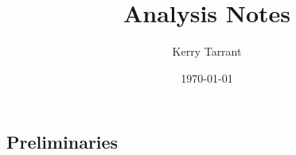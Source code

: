 \documentclass{book}
\title{Analysis Notes}
\author{Kerry Tarrant}
\date\today
\begin{document}
\maketitle
\tableofcontents{}


\chapter{}

\section{Preliminaries}
\end{document}
